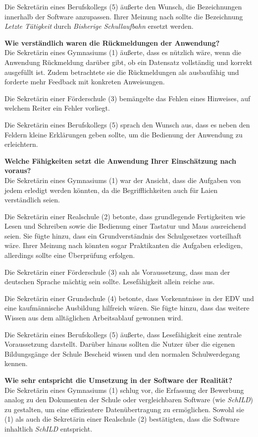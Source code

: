 Die Sekretärin eines Berufskollegs (5) äußerte den Wunsch, die Bezeichnungen innerhalb der Software anzupassen. Ihrer Meinung nach sollte die Bezeichnung \textit{Letzte Tätigkeit}  durch \textit{Bisherige Schullaufbahn}  ersetzt werden.

\textbf{Wie verständlich waren die Rückmeldungen der Anwendung?}\\
Die Sekretärin eines Gymnasiums (1) äußerte, dass es nützlich wäre, wenn die Anwendung Rückmeldung darüber gibt, ob ein Datensatz vollständig und korrekt ausgefüllt ist. Zudem betrachtete sie die Rückmeldungen als \glqq ausbaufähig\grqq{}  und forderte mehr Feedback mit konkreten Anweisungen.

Die Sekretärin einer Förderschule (3) bemängelte das Fehlen eines Hinweises, auf welchem Reiter ein Fehler vorliegt.

Die Sekretärin eines Berufskollegs (5) sprach den Wunsch aus, dass es neben den Feldern kleine Erklärungen geben sollte, um die Bedienung der Anwendung zu erleichtern.

\textbf{Welche Fähigkeiten setzt die Anwendung Ihrer Einschätzung nach voraus?}\\
Die Sekretärin eines Gymnasiums (1) war der Ansicht, dass die Aufgaben von jedem erledigt werden könnten, da die Begrifflichkeiten auch für Laien verständlich seien.

Die Sekretärin einer Realschule (2) betonte, dass grundlegende Fertigkeiten wie Lesen und Schreiben sowie die Bedienung einer Tastatur und Maus ausreichend seien. Sie fügte hinzu, dass ein Grundverständnis des Schulgesetzes vorteilhaft wäre. Ihrer Meinung nach könnten sogar Praktikanten die Aufgaben erledigen, allerdings sollte eine Überprüfung erfolgen.

Die Sekretärin einer Förderschule (3) sah als Voraussetzung, dass man der deutschen Sprache mächtig sein sollte. Lesefähigkeit allein reiche aus.

Die Sekretärin einer Grundschule (4) betonte, dass Vorkenntnisse in der EDV und eine kaufmännische Ausbildung hilfreich wären. Sie fügte hinzu, dass das weitere Wissen aus dem alltäglichen Arbeitsablauf gewonnen wird.

Die Sekretärin eines Berufskollegs (5) äußerte, dass Lesefähigkeit eine zentrale Voraussetzung darstellt. Darüber hinaus sollten die Nutzer über die eigenen Bildungsgänge der Schule Bescheid wissen und den normalen Schulwerdegang kennen.

\textbf{Wie sehr entspricht die Umsetzung in der Software der Realität?}\\
Die Sekretärin eines Gymnasiums (1) schlug vor, die Erfassung der Bewerbung analog zu den Dokumenten der Schule oder vergleichbaren Software (wie \textit{SchILD}) zu gestalten, um eine effizientere Datenübertragung zu ermöglichen. Sowohl sie (1) als auch die Sekretärin einer Realschule (2) bestätigten, dass die Software inhaltlich \textit{SchILD}  entspricht.

